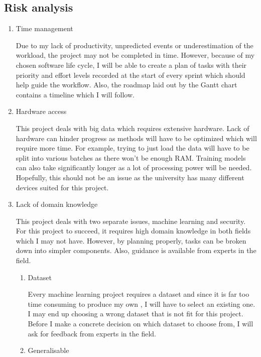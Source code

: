 \documentclass[11pt]{article}
\begin{document}
\subsection{Risk analysis}

\begin{enumerate}
  \item{Time management}

  Due to my lack of productivity, unpredicted events or underestimation of the workload, the project may not be completed in time. However, because of my chosen software life cycle, I will be able to create a plan of tasks with their priority and effort levels recorded at the start of every sprint which should help guide the workflow. Also, the roadmap laid out by the Gantt chart contains a timeline which I will follow.

  \item{Hardware access}

  This project deals with big data which requires extensive hardware. Lack of hardware can hinder progress as methods will have to be optimized which will require more time. For example, trying to just load the data will have to be split into various batches as there won’t be enough RAM. Training models can also take significantly longer as a lot of processing power will be needed. Hopefully, this should not be an issue as the university has many different devices suited for this project. 

  \item{Lack of domain knowledge}

  This project deals with two separate issues, machine learning and security. For this project to succeed, it requires high domain knowledge in both fields which I may not have. However, by planning properly, tasks can be broken down into simpler components. Also, guidance is available from experts in the field.

  \begin{enumerate}
    \item{Dataset}

    Every machine learning project requires a dataset and since it is far too time consuming to produce my own \cite{methodology-general}, I will have to select an existing one. I may end up choosing a wrong dataset that is not fit for this project. Before I make a concrete decision on which dataset to choose from, I will ask for feedback from experts in the field.

    \item{Generalisable}


\end{enumerate}
\end{enumerate}
\end{document}
